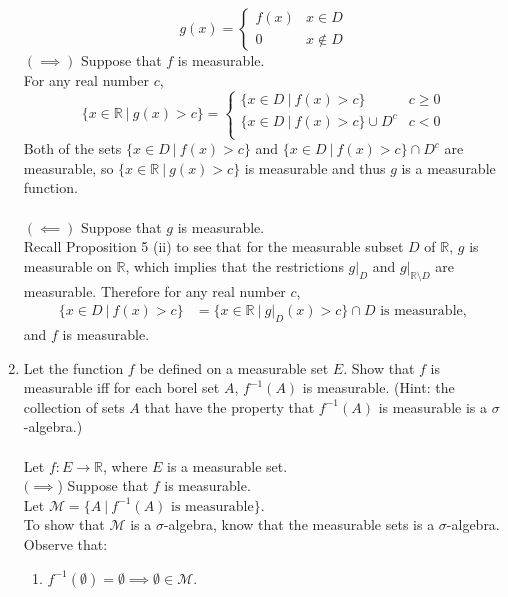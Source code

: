 \begin{enumerate}
    \[
        g(x)=
        \begin{cases}
            f(x)&x\in D\\
            0&x\notin D
        \end{cases}
    \]
    $(\implies)$ Suppose that $f$ is measurable.\\
    For any real number $c$,
    \[
        \{x\in \mathbb{R}\ |\ g(x)>c\}=
        \begin{cases}
            \{x\in D\ |\ f(x)>c\}&c\ge0\\
            \{x\in D\ |\ f(x)>c\}\cup D^c&c<0\\
        \end{cases}
    \]
    Both of the sets $\{x\in D\ |\ f(x)>c\}$ and $\{x\in D\ |\ f(x)>c\}\cap D^c$ are measurable, so $ \{x\in \mathbb{R}\ |\ g(x)>c\}$ is measurable and thus $g$ is a measurable function.\\
    \\$(\impliedby)$ Suppose that $g$ is measurable.\\
    Recall Proposition 5 (ii) to see that for the measurable subset $D$ of $\mathbb{R}$, $g$ is measurable on $\mathbb{R}$, which implies that the restrictions $g|_{D}$ and $g|_{\mathbb{R}\setminus D}$ are measurable.
    Therefore for any real number $c$,
    \begin{align*}
        \{x\in D\ |\ f(x)>c\}&=\{x\in \mathbb{R}\ |\ g|_{D}(x)>c\}\cap D\text{ is measurable},
    \end{align*}
    and $f$ is measurable.
    \item Let the function $f$ be defined on a measurable set $E$. Show that $f$ is measurable iff for each borel set $A$, $f^{-1}(A)$ is measurable. (Hint: the collection of sets $A$ that have the property that $f^{-1}(A)$ is measurable is a $\sigma$-algebra.)\\
    \\Let $f:E\to\mathbb{R}$, where $E$ is a measurable set.\\
    $(\implies$) Suppose that $f$ is measurable.\\
    Let $\mathcal{M}=\{A\ |\ f^{-1}(A)\text{ is measurable}\}$.\\
    To show that $\mathcal{M}$ is a $\sigma$-algebra, know that the measurable sets is a $\sigma$-algebra.\\
	Observe that:
	\begin{enumerate}[label=(\roman*),align=left]
		\item $f^{-1}(\emptyset)=\emptyset\implies\emptyset\in \mathcal{M}$.

\end{enumerate}
\end{enumerate}
